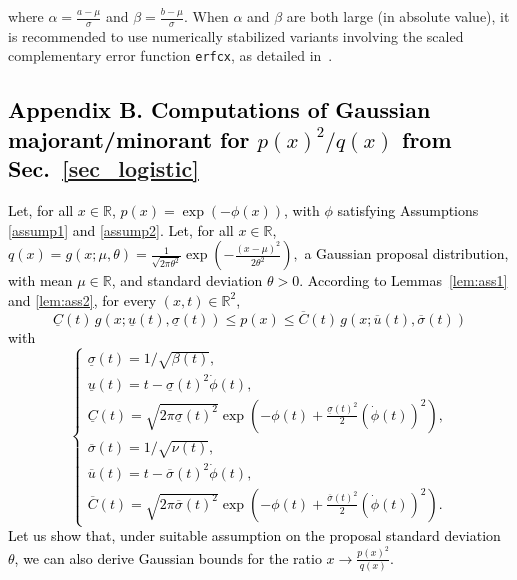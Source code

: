 \documentclass[review]{elsarticle}
\newcommand{\cblue}{\textcolor{black}}
\begin{document}
where $\alpha = \frac{a - \mu}{\sigma}$ and $\beta = \frac{b - \mu}{\sigma}$. When $\alpha$ and $\beta$ are both large (in absolute value), it is recommended to use numerically stabilized variants involving the scaled complementary error function \texttt{erfcx}, as detailed in~\cite{jorge2018,chevillard2012}.

 

\cblue{
\section*{Appendix B. Computations of Gaussian majorant/minorant for $p(x)^2/q(x)$ from Sec.~\ref{sec_logistic}}
\label{app:bounds_p^2/q}

Let, for all $x \in \mathbb{R}$, $p(x) = \exp(-\phi(x))$, with $\phi$ satisfying Assumptions \ref{assump1} and \ref{assump2}. Let, for all $x \in \mathbb{R}$, $q(x)=g(x;\mu,\theta)
=
\frac{1}{\sqrt{2\pi\theta^2}}
\exp\left(-\frac{(x-\mu)^2}{2\theta^2}\right),
$
a Gaussian proposal distribution, with mean $\mu \in \mathbb{R}$, and standard deviation $\theta>0$. According to Lemmas~\ref{lem:ass1} and \ref{lem:ass2}, 
for every $(x,t)\in\mathbb{R}^2$,
\begin{equation}
\label{bounds_over_p}
\underline{C}(t)\, g(x;\underline{u}(t),\underline{\sigma}(t)) \leq p(x) 
\leq \overline{C}(t)\, g(x;\overline{u}(t),\overline{\sigma}(t))
\end{equation}
with
\begin{equation}
\begin{cases}
\underline{\sigma}(t)=1/\sqrt{\beta(t)},\\
\underline{u}(t)=t-\underline{\sigma}(t)^2\dot{\phi}(t),\\
\underline{C}(t)=\sqrt{2\pi \underline{\sigma}(t)^2}
\exp\left(-\phi(t)+\frac{\underline{\sigma}(t)^2}{2}(\dot{\phi}(t))^2\right),\\
\overline{\sigma}(t)=1/\sqrt{\nu(t)},\\
\overline{u}(t)=t-\overline{\sigma}(t)^2\dot{\phi}(t),\\
\overline{C}(t)=\sqrt{2\pi \overline{\sigma}(t)^2}
\exp\left(-\phi(t)+\frac{\overline{\sigma}(t)^2}{2}(\dot{\phi}(t))^2\right).
\end{cases}
\end{equation}
Let us show that, under suitable assumption on the proposal standard deviation $\theta$, we can also derive Gaussian bounds for the ratio
$
x \to \frac{p(x)^2}{q(x)}.
$


}
\end{document}
